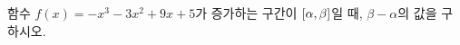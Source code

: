 함수 $f(x)=-x^3-3x^2+9x+5$가 증가하는 구간이 $[\alpha{,}\mkern3mu\mathopen{}\beta]$일 때, $\beta-\alpha$의 값을 구하시오.
